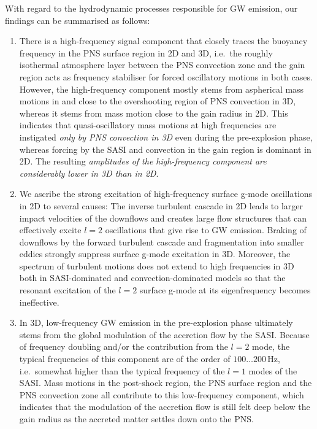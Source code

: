 With regard to the hydrodynamic processes responsible for GW
emission, our findings can be summarised as follows:
\begin{enumerate}
\item There is a high-frequency signal component that closely traces
  the buoyancy frequency in the PNS surface region in 2D and 3D,
  i.e.\ the roughly isothermal atmosphere layer between the PNS
  convection zone and the gain region acts as frequency stabiliser for
  forced oscillatory motions in both cases.  However, the
  high-frequency component mostly stems from aspherical mass motions
  in and close to the overshooting region of PNS convection in 3D,
  whereas it stems from mass motion close to the gain radius in
  2D. This indicates that quasi-oscillatory mass motions at
  high frequencies are instigated \emph{only by PNS
    convection in 3D} even during the pre-explosion phase, whereas
  forcing by the SASI and convection in the gain region is dominant in
  2D. The resulting \emph{amplitudes of the high-frequency component
  are considerably lower in 3D than in 2D}.
\item We ascribe the strong excitation of high-frequency surface
  g-mode oscillations in 2D to several causes: The inverse turbulent
  cascade in 2D leads to larger impact velocities of the downflows and
  creates large flow structures that can effectively excite $l=2$
  oscillations that give rise to GW emission. Braking of downflows by
  the forward turbulent cascade and fragmentation into smaller eddies strongly
  suppress surface g-mode excitation in 3D. Moreover, the spectrum of
  turbulent motions does not extend to high frequencies in 3D both in
  SASI-dominated and convection-dominated models so that the resonant
  excitation of the $l=2$ surface g-mode at its eigenfrequency becomes
  ineffective.
\item In 3D, low-frequency GW emission in the pre-explosion phase
  ultimately stems from the global modulation of the accretion flow by
  the SASI. Because of frequency doubling and/or the contribution
  from the $l=2$ mode, the typical frequencies of this component are
  of the order of $100 \ldots 200 \, \mathrm{Hz}$, i.e.\ somewhat
  higher than the typical frequency of the $l=1$ modes of the SASI.
  Mass motions in the post-shock region, the PNS surface
  region and the PNS convection zone all contribute to this
  low-frequency component, which indicates that the modulation of the
  accretion flow is still felt deep below the gain radius as the accreted
  matter settles down onto the PNS.

\end{enumerate}
